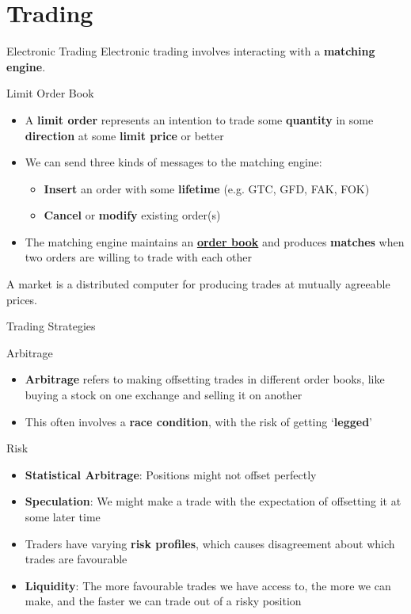 \documentclass{beamer}
\begin{document}
\section{Trading}
\begin{frame}{Electronic Trading}
	Electronic trading involves interacting with a \textbf{matching engine}.
	\begin{block}{Limit Order Book}
		\begin{itemize}
			\item A \textbf{limit order} represents an intention to trade some \textbf{quantity} in some \textbf{direction} at some \textbf{limit price} or better
			\item We can send three kinds of messages to the matching engine:
			\begin{itemize}
				\item \textbf{Insert} an order with some \textbf{lifetime} (e.g. GTC, GFD, FAK, FOK)
				\item \textbf{Cancel} or \textbf{modify} existing order(s)
			\end{itemize}
			\item The matching engine maintains an \href{https://www.binance.com/en-AU/trade/BTC_USDT}{\textbf{order book}} and produces \textbf{matches} when two orders are willing to trade with each other
		\end{itemize}
	\end{block}
	A market is a distributed computer for producing trades at mutually agreeable prices.
\end{frame}

\begin{frame}{Trading Strategies}
	\begin{block}{Arbitrage}
		\begin{itemize}
			\item \textbf{Arbitrage} refers to making offsetting trades in different order books, like buying a stock on one exchange and selling it on another
			\item This often involves a \textbf{race condition}, with the risk of getting `\textbf{legged}'
		\end{itemize}
	\end{block}
	\pause
	\begin{block}{Risk}
		\begin{itemize}
			\item \textbf{Statistical Arbitrage}: Positions might not offset perfectly
			\item \textbf{Speculation}: We might make a trade with the expectation of offsetting it at some later time
			\item Traders have varying \textbf{risk profiles}, which causes disagreement about which trades are favourable
			\item \textbf{Liquidity}: The more favourable trades we have access to, the more we can make, and the faster we can trade out of a risky position
		\end{itemize}
	\end{block}

\end{frame}
\end{document}
